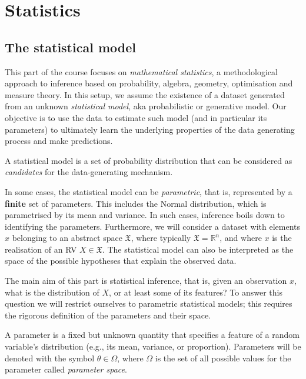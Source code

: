 

\section{Statistics}
\label{cap:stas}



\subsection{The statistical model}
\label{cap:stats_SM}


This part of the course focuses on \emph{mathematical statistics}, a methodological approach to inference based on probability, algebra, geometry, optimisation and measure theory. In this setup, we assume the existence of a dataset generated from an unknown \emph{statistical model}, aka probabilistic or generative model. Our objective is to use the data to estimate such model (and in particular its parameters) to ultimately learn the underlying properties of the data generating process and make predictions.

\begin{definition} 
A statistical model is a set of probability distribution that can be considered as \emph{candidates} for the data-generating mechanism. 
\end{definition}

In some cases, the statistical model can be \emph{parametric}, that is, represented by a \textbf{finite} set of parameters. This includes the Normal distribution, which is parametrised by its mean and variance. In such cases, inference boils down to identifying the parameters. Furthermore, we will consider a dataset with elements $x$ belonging to an abstract space $\mathfrak{X}$, where typically $\mathfrak{X} = \mathbb{R}^n$, and where $x$ is the realisation of an RV $X\in\mathfrak{X}$. The statistical model can also be interpreted as the space of the possible hypotheses that explain the observed data. 

The main aim of this part is statistical inference, that is, given an observation $x$, what is the distribution of $X$, or at least some of its features? To answer this question we will restrict ourselves to parametric statistical models; this requires the rigorous definition of the parameters and their space. 

\begin{definition} A parameter is a fixed but unknown quantity that specifies a feature of a random variable's distribution (e.g., its mean, variance, or proportion). Parameters will be denoted with the symbol $\theta\in\Omega$, where $\Omega$ is the set of all possible values for the parameter called \emph{parameter space}.
\end{definition}

